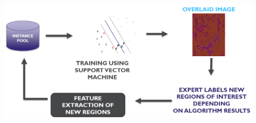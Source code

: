 \documentclass[portrait,final,a0paper]{baposter}
\begin{document}
\begin{poster}
{\begin{minipage}{.25\textwidth}
\end{minipage} 
\begin{minipage}{.40\textwidth}
\color{black}
\newline 
{}
\newline
\includegraphics[width=0.97\textwidth]{activelearning2}	
\end{minipage} 						
}


\end{poster}
\end{document}
